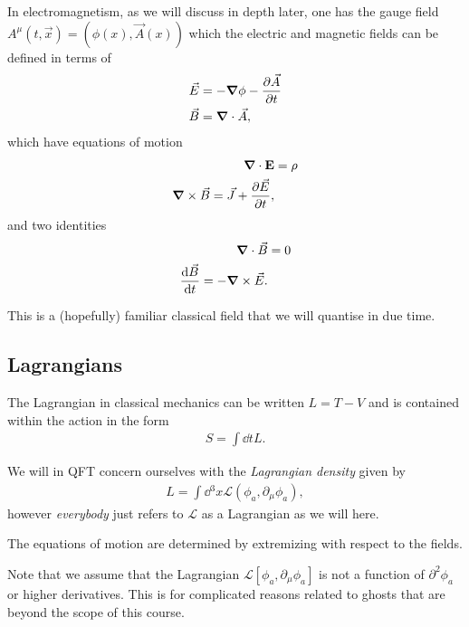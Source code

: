 \begin{example}
    In electromagnetism, as we will discuss in depth later, one has the gauge field $A^{\mu} \left( t, \vec{x} \right) = \left( \phi \left( x \right) , \vec{A}\left( x \right)  \right) $ which the electric and magnetic fields can be defined in terms of
    \begin{align}
        \vec{E} &= - \grad \phi - \pdv{\vec{A}}{t} \\
        \vec{B} &= \grad \cdot \vec{A}
    ,\end{align}
    which have equations of motion
    \begin{align}
        \grad \cdot \vb{E} &= \rho  \\
        \grad \times  \vec{B} = \vec{J} + \pdv{\vec{E}}{t}
    ,\end{align}
    and two identities
\begin{align}
    \grad \cdot \vec{B} &= 0 \\
    \dv{\vec{B}}{t} = - \grad \times \vec{E}
.\end{align}

This is a (hopefully) familiar classical field that we will quantise in due time.
\end{example}


\subsection{Lagrangians}

The Lagrangian in classical mechanics can be written $L = T - V$ and is contained within the action in the form
\begin{align}
    S = \int \dd{t} L
.\end{align}

We will in QFT concern ourselves with the \textit{Lagrangian density} given by
\begin{align}
    L = \int \dd{^3x} \mathcal{L} \left( \phi_a , \partial_\mu \phi_a \right) 
,\end{align}
however \textit{everybody} just refers to $\mathcal{L}$ as a Lagrangian as we will here.

The equations of motion are determined by extremizing with respect to the fields. 

\begin{note}
    Note that we assume that the Lagrangian $\mathcal{L}\left[ \phi_a, \partial_\mu \phi_a \right] $ is not a function of $\partial^2 \phi_a$ or higher derivatives. This is for complicated reasons related to ghosts that are beyond the scope of this course.
\end{note}

